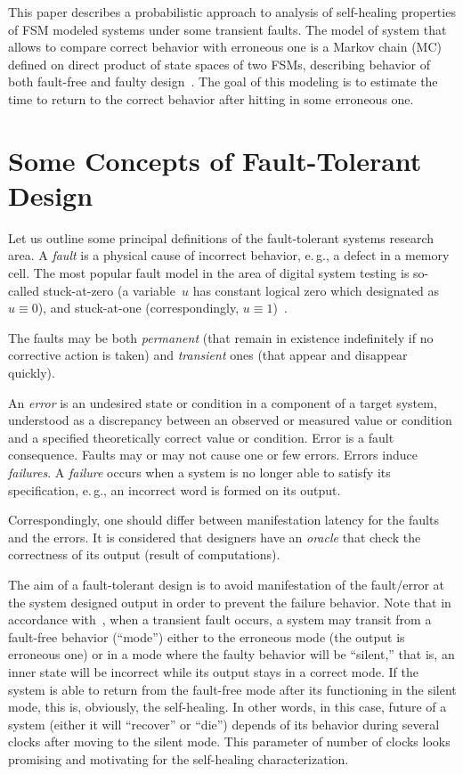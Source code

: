 \begin{multicols}{2}
This paper describes a probabilistic approach to
analysis of self-healing properties of FSM modeled
systems under some transient faults.
The model of system that allows to compare correct
behavior with erroneous one is a Markov chain (MC)
defined on direct product of state spaces of two FSMs,
describing behavior of both fault-free and faulty
design~\cite{7fr, 8fr}.
The goal of this modeling is to estimate the time
to return to the correct behavior after hitting in
some erroneous one.

\section{Some Concepts of Fault-Tolerant Design}

\noindent
Let us outline some principal definitions of the
fault-tolerant systems research area.
A {\it fault} is a physical cause of incorrect behavior,
e.\,g., a defect in a memory cell.
The most popular fault model in the area of digital
system testing is so-called stuck-at-zero (a variable~$u$
has constant logical zero which designated as
$u\equiv 0$), and stuck-at-one (correspondingly,
$u\equiv 1$)~\cite{2fr}.

The faults may be both \textit{permanent} (that remain in
existence indefinitely if no corrective action is
taken) and \textit{transient} ones (that appear and disappear
quickly).

An \textit{error} is an undesired state or condition in
a component of a target system, understood as a
discrepancy between an observed or measured value
or condition and a specified theoretically correct
value or condition.
Error is a fault consequence.
Faults may or may not cause one or few errors.
Errors induce \textit{failures}.
A \textit{failure} occurs when a system is no longer able to
satisfy its specification, e.\,g., an incorrect word
is formed on its output.

Correspondingly, one should differ between
manifestation latency for the faults and the
errors.
It is considered that designers have an \textit{oracle} that check
the correctness of its output (result of
computations).

The aim of a fault-tolerant design is to avoid
manifestation of the fault/error at the system
designed output in order to prevent the failure
behavior.
Note that in accordance with~\cite{6fr}, when a transient
fault occurs, a system may transit from a fault-free
behavior (``mode'') either to the erroneous mode
(the output is erroneous one) or in a mode where
the faulty behavior will be ``silent,'' that is, an
inner state will be incorrect while its output stays
in a correct mode.
If the system is able to return from the fault-free
mode after its functioning in the silent mode, this
is, obviously, the self-healing.
In other words, in this case, future of a system
(either it will ``recover'' or ``die'') depends of its
behavior during several clocks after moving to the
silent mode.
This parameter of number of clocks looks promising
and motivating for the self-healing characterization.


\end{multicols}
